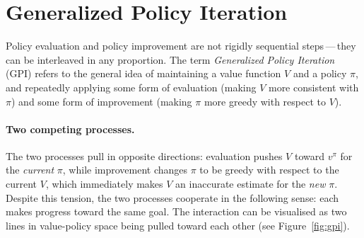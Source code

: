 \section{Generalized Policy Iteration}
\label{sec:gpi}

Policy evaluation and policy improvement are not rigidly sequential steps\,---\,they can be interleaved in any proportion.  The term \emph{Generalized Policy Iteration} (GPI) refers to the general idea of maintaining a value function $V$ and a policy $\pi$, and repeatedly applying some form of evaluation (making $V$ more consistent with $\pi$) and some form of improvement (making $\pi$ more greedy with respect to $V$).

\paragraph{Two competing processes.}
The two processes pull in opposite directions: evaluation pushes $V$ toward $v^\pi$ for the \emph{current} $\pi$, while improvement changes $\pi$ to be greedy with respect to the current $V$, which immediately makes $V$ an inaccurate estimate for the \emph{new} $\pi$.  Despite this tension, the two processes cooperate in the following sense: each makes progress toward the same goal.  The interaction can be visualised as two lines in value-policy space being pulled toward each other (see Figure~\ref{fig:gpi}).

